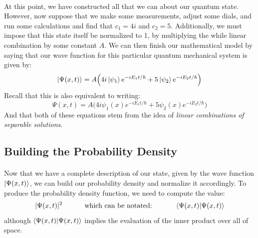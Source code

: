 \documentclass[12pt,letterpaper]{book}
\begin{document}
\paragraph*{}At this point, we have constructed all that we can about our quantum state. However, now suppose that we make some measurements, adjust some dials, and run some calculations and find that $c_1 = 4i$ and $c_2 = 5$. Additionally, we must impose that this state itself be normalized to 1, by multiplying the while linear combination by some constant $A$. We can then finish our mathematical model  by saying that our wave function for this particular quantum mechanical system is given by:
\begin{equation}
\label{ex1 sys ket dirac}
\ket{\Psi(x,t)} = A \Big( 4i \ket{\psi_1}e^{-iE_1t/\hbar} + 5 \ket{\psi_2} e^{-iE_2t/\hbar} \Big)
\end{equation}
Recall that this is also equivalent to writing:
\begin{equation}
\label{ex1 sys non-dirac}
\Psi(x,t) =  A \Big( 4i\psi_1(x)e^{-iE_1t/\hbar} + 5\psi_2(x)e^{-iE_2t/\hbar} \Big)
\end{equation}
And that both of these equations stem from the idea of \textit{linear combinations of separable solutions}.


\subsection*{Building the Probability Density}
\paragraph*{}Now that we have a complete description of our state, given by the wave function $\ket{\Psi(x,t)}$, we can build our probability density and normalize it accordingly. To produce the probability density function, we need to compute the value:
\begin{equation}
|\Psi(x,t)|^2 \text{\hspace{1cm} which can be notated: \hspace{1cm}} \braket{\Psi(x,t)}{\Psi(x,t)}
\end{equation}
although $\braket{\Psi(x,t)}{\Psi(x,t)}$ implies the evaluation of the inner product over all of space.
\end{document}
